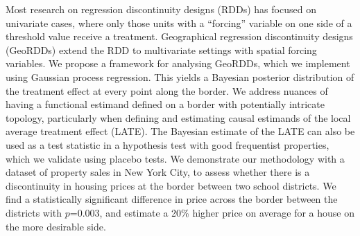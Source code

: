 Most research on regression discontinuity designs (RDDs) has focused on univariate cases, where only those units with a ``forcing'' variable on one side of a threshold value receive a treatment.
Geographical regression discontinuity designs (GeoRDDs) extend the RDD to multivariate settings with spatial forcing variables.
We propose a framework for analysing GeoRDDs, which we implement using Gaussian process regression. 
This yields a Bayesian posterior distribution of the treatment effect at every point along the border.
We address nuances of having a functional estimand defined on a border with potentially intricate topology, particularly when defining and estimating causal estimands of the local average treatment effect (LATE).
The Bayesian estimate of the LATE can also be used as a test statistic
in a hypothesis test with good frequentist properties, 
which we validate using placebo tests.
We demonstrate our methodology with a dataset of property sales in New York City,
to assess whether there is a discontinuity in housing prices at the border between two school districts.
We find a statistically significant difference in price across the border between the districts with \(p\)=0.003, and estimate a 20\%  higher price on average for a house on the more desirable side.
